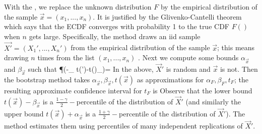 With the , we replace the unknown distribution $F$ by the empirical distribution of the sample
$\vec{x}=(x_1,...,x_n)$. It is justified by the Glivenko-Cantelli
theorem which says that the ECDF converges with probability 1
to the true CDF $F()$ when $n$ gets large. Specifically, the method draws an iid sample $\vec{X'}=(X_1',...,X_n')$ from the empirical distribution of the sample
$\vec{x}$; this means drawing $n$ times from the list
$(x_1,...,x_n)$ . Next we compute some bounds $\alpha_{\vec{x}}$ and $\beta_{\vec{x}}$ such that
\ben
\P(-\alpha_{} \leq t(')-t()\leq \beta_{})= \gamma
\een  
In the above, $\vec{X}'$ is random and $\vec{x}$ is not. Then the bootstrap method takes $\alpha_{\vec{x}}, \beta_{\vec{x}}, t(\vec{x})$ as approximations for $\alpha_F, \beta_F, t_F$; the resulting approximate confidence interval for $t_F$ is
\een
Observe that the lower bound $t(\vec{x})-\beta_{\vec{x}}$ is a $\frac{1-\gamma}{2}-$percentile of the distribution of $\vec{X}'$ (and similarly the upper bound $t(\vec{x})+\alpha_{\vec{x}}$ is a $\frac{1+\gamma}{2}-$percentile of the distribution of $\vec{X}'$). The method estimates them using percentiles of many independent replications of $\vec{X}'$.  



